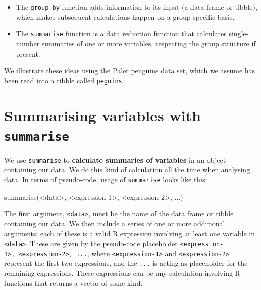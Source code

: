 \documentclass[
]{book}
\newenvironment{Shaded}{\begin{snugshade}}{\end{snugshade}}
\newcommand{\DecValTok}[1]{\textcolor[rgb]{0.00,0.00,0.81}{#1}}
\newcommand{\FunctionTok}[1]{\textcolor[rgb]{0.00,0.00,0.00}{#1}}
\newcommand{\NormalTok}[1]{#1}
\newcommand{\SpecialCharTok}[1]{\textcolor[rgb]{0.00,0.00,0.00}{#1}}
\begin{document}
\begin{itemize}
\item
  The \texttt{group\_by} function adds information to its input (a data frame or tibble), which makes subsequent calculations happen on a group-specific basis.
\item
  The \texttt{summarise} function is a data reduction function that calculates single-number summaries of one or more variables, respecting the group structure if present.
\end{itemize}

We illustrate these ideas using the Paler penguins data set, which we assume has been read into a tibble called \texttt{peguins}.

\hypertarget{summarising-variables-with-summarise}{%
\section{\texorpdfstring{Summarising variables with \texttt{summarise}}{Summarising variables with summarise}}\label{summarising-variables-with-summarise}}

We use \texttt{summarise} to \textbf{calculate summaries of variables} in an object containing our data. We do this kind of calculation all the time when analysing data. In terms of pseudo-code, usage of \texttt{summarise} looks like this:

\begin{Shaded}
\begin{Highlighting}[]
\FunctionTok{summarise}\NormalTok{(}\SpecialCharTok{\textless{}}\NormalTok{data}\SpecialCharTok{\textgreater{}}\NormalTok{, }\SpecialCharTok{\textless{}}\NormalTok{expression}\DecValTok{{-}1}\SpecialCharTok{\textgreater{}}\NormalTok{, }\SpecialCharTok{\textless{}}\NormalTok{expression}\DecValTok{{-}2}\SpecialCharTok{\textgreater{}}\NormalTok{, ...)}
\end{Highlighting}
\end{Shaded}

The first argument, \texttt{\textless{}data\textgreater{}}, must be the name of the data frame or tibble containing our data. We then include a series of one or more additional arguments; each of these is a valid R expression involving at least one variable in \texttt{\textless{}data\textgreater{}}. These are given by the pseudo-code placeholder \texttt{\textless{}expression-1\textgreater{},\ \textless{}expression-2\textgreater{},\ ...}, where \texttt{\textless{}expression-1\textgreater{}} and \texttt{\textless{}expression-2\textgreater{}} represent the first two expressions, and the \texttt{...} is acting as placeholder for the remaining expressions. These expressions can be any calculation involving R functions that returns a vector of some kind.
\end{document}

